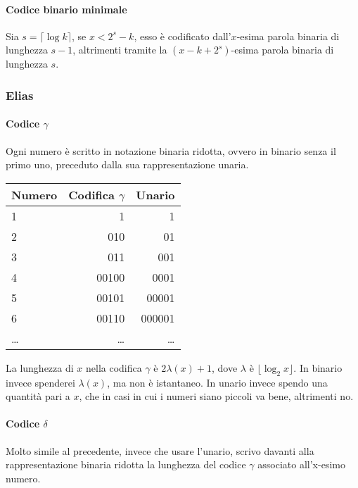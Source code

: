 \paragraph{Codice binario minimale} 
Sia $s = \lceil \log k \rceil$, se $x < 2^s - k$, esso è codificato dall'$x$-esima parola binaria
di lunghezza $s-1$, altrimenti tramite la $(x-k + 2^s)$-esima parola binaria di lunghezza $s$.



\subsubsection{Elias}

\paragraph{Codice $\gamma$}
Ogni numero è scritto in notazione binaria ridotta, ovvero in binario senza il primo uno, preceduto dalla sua rappresentazione unaria.
\begin{center}
    \begin{tabular}{|l | r | r |}
        \hline
        Numero & Codifica $\gamma$ & Unario\\
        \hline
        1 & 1 & 1\\
        2 & 010 & 01\\
        3 & 011 & 001\\ 
        4 & 00100 & 0001\\ 
        5 & 00101 & 00001\\ 
        6 & 00110 & 000001\\ 
        \dots & \dots & \dots\\
        \hline
    \end{tabular}
\end{center}

La lunghezza di $x$ nella codifica $\gamma$ è $2\lambda(x) + 1$, dove $\lambda$ è
$\lfloor \log_2 x\rfloor$.
In binario invece spenderei $\lambda(x)$, ma non è istantaneo. In unario invece 
spendo una quantità pari a $x$, che in casi in cui i numeri siano piccoli va bene, altrimenti no.

\paragraph{Codice $\delta$}
Molto simile al precedente, invece che usare l'unario, 
scrivo davanti alla rappresentazione binaria ridotta la lunghezza 
del codice $\gamma$ associato all'x-esimo numero.

